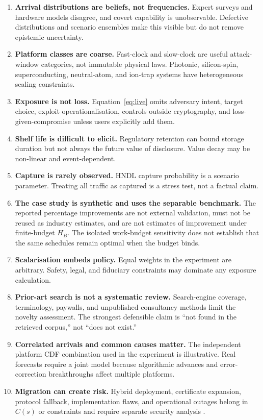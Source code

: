 \documentclass[10pt]{article}
\begin{document}
\begin{enumerate}
\item \textbf{Arrival distributions are beliefs, not frequencies.} Expert surveys and hardware models disagree, and covert capability is unobservable. Defective distributions and scenario ensembles make this visible but do not remove epistemic uncertainty.
\item \textbf{Platform classes are coarse.} Fast-clock and slow-clock are useful attack-window categories, not immutable physical laws. Photonic, silicon-spin, superconducting, neutral-atom, and ion-trap systems have heterogeneous scaling constraints.
\item \textbf{Exposure is not loss.} Equation~\eqref{eq:live} omits adversary intent, target choice, exploit operationalisation, controls outside cryptography, and loss-given-compromise unless users explicitly add them.
\item \textbf{Shelf life is difficult to elicit.} Regulatory retention can bound storage duration but not always the future value of disclosure. Value decay may be non-linear and event-dependent.
\item \textbf{Capture is rarely observed.} HNDL capture probability is a scenario parameter. Treating all traffic as captured is a stress test, not a factual claim.
\item \textbf{The case study is synthetic and uses the separable benchmark.} The reported percentage improvements are not external validation, must not be reused as industry estimates, and are not estimates of improvement under finite-budget $H_B$. The isolated work-budget sensitivity does not establish that the same schedules remain optimal when the budget binds.
\item \textbf{Scalarisation embeds policy.} Equal weights in the experiment are arbitrary. Safety, legal, and fiduciary constraints may dominate any exposure calculation.
\item \textbf{Prior-art search is not a systematic review.} Search-engine coverage, terminology, paywalls, and unpublished consultancy methods limit the novelty assessment. The strongest defensible claim is ``not found in the retrieved corpus,'' not ``does not exist.''
\item \textbf{Correlated arrivals and common causes matter.} The independent platform CDF combination used in the experiment is illustrative. Real forecasts require a joint model because algorithmic advances and error-correction breakthroughs affect multiple platforms.
\item \textbf{Migration can create risk.} Hybrid deployment, certificate expansion, protocol fallback, implementation flaws, and operational outages belong in $C(s)$ or constraints and require separate security analysis \cite{hasan2024}.
\end{enumerate}
\end{document}
